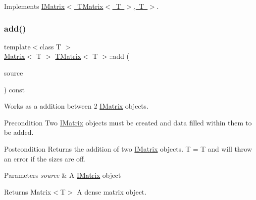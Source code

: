 Implements \mbox{\hyperlink{class_i_matrix_a661dc43bb607b98c28414cdd49bc64f7}{I\+Matrix$<$ T\+Matrix$<$ T $>$, T $>$}}.

\mbox{\label{class_t_matrix_acd10f3284cbf49a0d514354bfa3e30ed}} 
\subsubsection{\texorpdfstring{add()}{add()}\hspace{0.1cm}{\footnotesize\ttfamily [3/6]}}
{\footnotesize\ttfamily template$<$class T $>$ \\
\mbox{\hyperlink{class_matrix}{Matrix}}$<$ T $>$ \mbox{\hyperlink{class_t_matrix}{T\+Matrix}}$<$ T $>$\+::add (\begin{DoxyParamCaption}\item[{const \mbox{\hyperlink{class_i_matrix}{I\+Matrix}}$<$ \mbox{\hyperlink{class_l_matrix}{L\+Matrix}}$<$ T $>$, T $>$ \&}]{source }\end{DoxyParamCaption}) const}



Works as a addition between 2 \mbox{\hyperlink{class_i_matrix}{I\+Matrix}} objects. 

\begin{DoxyPrecond}{Precondition}
Two \mbox{\hyperlink{class_i_matrix}{I\+Matrix}} objects must be created and data filled within them to be added. 
\end{DoxyPrecond}
\begin{DoxyPostcond}{Postcondition}
Returns the addition of two \mbox{\hyperlink{class_i_matrix}{I\+Matrix}} objects. T = T and will throw an error if the sizes are off.
\end{DoxyPostcond}

\begin{DoxyParams}{Parameters}
{\em source} & A \mbox{\hyperlink{class_i_matrix}{I\+Matrix}} object \\
\hline
\end{DoxyParams}
\begin{DoxyReturn}{Returns}
Matrix$<$\+T$>$ A dense matrix object. 
\end{DoxyReturn}
\mbox{\label{class_t_matrix_a9673d1a97a3408923022162571683b74}} 
